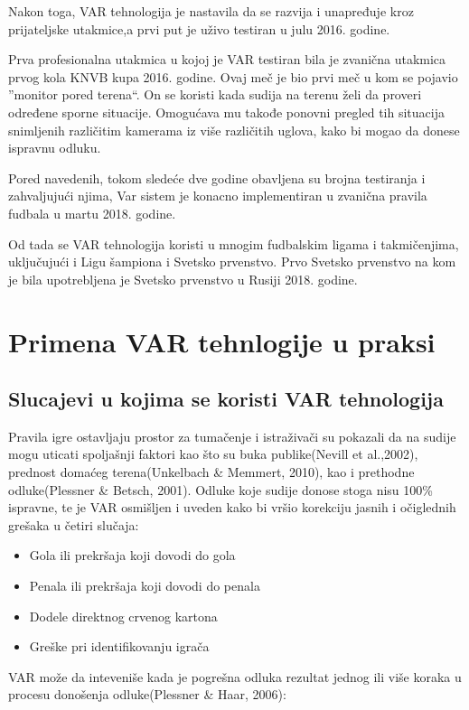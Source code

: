 \documentclass[a4paper]{article}
\begin{document}
Nakon toga, VAR tehnologija je nastavila da se razvija i unapređuje kroz prijateljske utakmice,a prvi put je uživo testiran u julu 2016. godine. 

Prva profesionalna utakmica u kojoj je VAR testiran bila je zvanična utakmica prvog kola KNVB kupa 2016. godine. Ovaj meč je bio prvi meč u kom se pojavio ”monitor pored terena“. On se koristi kada sudija na terenu želi da proveri određene sporne situacije. Omogućava mu takođe ponovni pregled tih situacija snimljenih različitim kamerama iz više različitih uglova, kako bi mogao da donese ispravnu odluku.

Pored navedenih, tokom sledeće dve godine obavljena su brojna testiranja i zahvaljujući njima, Var sistem je konacno implementiran u zvanična pravila fudbala u martu 2018. godine.

Od tada se VAR tehnologija koristi u mnogim fudbalskim ligama i takmičenjima, uključujući i Ligu šampiona i Svetsko prvenstvo. Prvo Svetsko prvenstvo na kom je bila upotrebljena je Svetsko prvenstvo u Rusiji 2018. godine. \cite{prvenstvo}

\section{Primena VAR tehnlogije u praksi}
\subsection{Slucajevi u kojima se koristi VAR tehnologija}
Pravila igre ostavljaju prostor za tumačenje i istraživači su pokazali da na sudije mogu uticati spoljašnji faktori kao što su buka publike(Nevill et al.,2002), prednost domaćeg terena(Unkelbach \& Memmert, 2010), kao i prethodne odluke(Plessner \& Betsch, 2001). Odluke koje sudije donose stoga nisu 100\% ispravne, te je VAR osmišljen i uveden kako bi vršio korekciju jasnih i očiglednih grešaka u četiri slučaja:
\begin{itemize}
\item Gola ili prekršaja koji dovodi do gola
\item Penala ili prekršaja koji dovodi do penala
\item Dodele direktnog crvenog kartona
\item Greške pri identifikovanju igrača
\end{itemize}

VAR može da inteveniše kada je pogrešna odluka rezultat jednog ili više koraka u procesu donošenja odluke(Plessner \& Haar, 2006):
\end{document}
